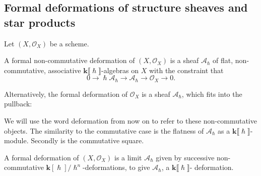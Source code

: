     \subsection{Formal deformations of structure sheaves and star products} 
    
    Let \((X,\mathcal{O}_X)\) be a scheme.  

    \begin{defn}
    A formal non-commutative deformation of \((X,\mathcal{O}_X)\) is a sheaf \( \mathcal{A}_{\hslash} \) of flat, non-commutative, associative \( \mathbf{k}\lBrack \hslash \rBrack \)-algebras on \(X\) with the constraint that \begin{equation} 
    \label{eqn:def_cons}
    0 \rightarrow \hslash \mathcal{A}_\hslash \rightarrow  \mathcal{A}_{\hslash} \rightarrow \mathcal{O}_X  \rightarrow 0 .
    \end{equation}
    \end{defn}
    
    Alternatively, the formal deformation of \(\mathcal{O}_X\) is a sheaf \( \mathcal{A}_{\hslash}\), which fits into the pullback:
    \begin{center}
    \end{center}
    \begin{rem} 
    We will use the word deformation from now on to refer to these non-commutative objects. The similarity to the commutative case is the flatness of \( \mathcal{A}_{\hslash} \) as a \( \mathbf{k}\lBrack \hslash \rBrack\)-module. Secondly is the commutative square. 
    \end{rem} 
    
    A formal deformation of \( (X,\mathcal{O}_X)\) is a limit \(\mathcal{A}_{\hslash}\) given by successive non-commutative \( \mathbf{k}[\hslash]/\hslash^n\)-deformations, to give \( \mathcal{A}_{\hslash}\), a \( \mathbf{k} \lBrack \hslash \rBrack \)- deformation. 
    \begin{center} 
    \end{center} 
    

